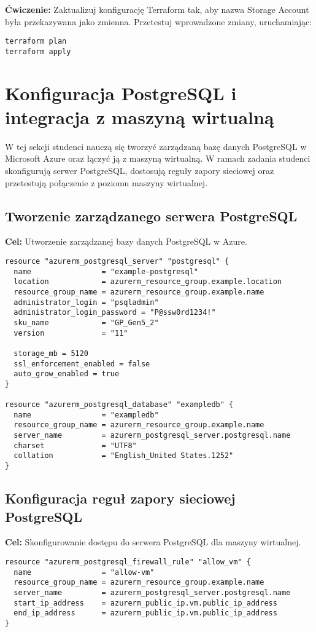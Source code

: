 \documentclass{article}
\begin{document}
\textbf{Ćwiczenie:} Zaktualizuj konfigurację Terraform tak, aby nazwa Storage Account była przekazywana jako zmienna. Przetestuj wprowadzone zmiany, uruchamiając:
\begin{lstlisting}
terraform plan
terraform apply
\end{lstlisting}


\section{Konfiguracja PostgreSQL i integracja z maszyną wirtualną}
W tej sekcji studenci nauczą się tworzyć zarządzaną bazę danych PostgreSQL w Microsoft Azure oraz łączyć ją z maszyną wirtualną. W ramach zadania studenci skonfigurują serwer PostgreSQL, dostosują reguły zapory sieciowej oraz przetestują połączenie z poziomu maszyny wirtualnej.

\subsection{Tworzenie zarządzanego serwera PostgreSQL}
\textbf{Cel:} Utworzenie zarządzanej bazy danych PostgreSQL w Azure.

\begin{lstlisting}
resource "azurerm_postgresql_server" "postgresql" {
  name                = "example-postgresql"
  location            = azurerm_resource_group.example.location
  resource_group_name = azurerm_resource_group.example.name
  administrator_login = "psqladmin"
  administrator_login_password = "P@ssw0rd1234!"
  sku_name            = "GP_Gen5_2"
  version             = "11"

  storage_mb = 5120
  ssl_enforcement_enabled = false
  auto_grow_enabled = true
}

resource "azurerm_postgresql_database" "exampledb" {
  name                = "exampledb"
  resource_group_name = azurerm_resource_group.example.name
  server_name         = azurerm_postgresql_server.postgresql.name
  charset             = "UTF8"
  collation           = "English_United States.1252"
}
\end{lstlisting}

\subsection{Konfiguracja reguł zapory sieciowej PostgreSQL}
\textbf{Cel:} Skonfigurowanie dostępu do serwera PostgreSQL dla maszyny wirtualnej.

\begin{lstlisting}
resource "azurerm_postgresql_firewall_rule" "allow_vm" {
  name                = "allow-vm"
  resource_group_name = azurerm_resource_group.example.name
  server_name         = azurerm_postgresql_server.postgresql.name
  start_ip_address    = azurerm_public_ip.vm.public_ip_address
  end_ip_address      = azurerm_public_ip.vm.public_ip_address
}
\end{lstlisting}
\end{document}
